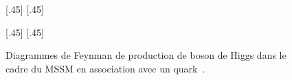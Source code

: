 \begin{figure}[h]
\centering
\vspace{\baselineskip}
\subcaptionbox{\label{subfig-fgraph-Higgs_with_b_qq_g_bbh-MSSM}}[.45\textwidth]
{\vspace{\baselineskip}}
\hfill
\subcaptionbox{\label{subfig-fgraph-gg_hHAbb}}[.45\textwidth]
{\vspace{\baselineskip}}

\vspace{2\baselineskip}
\subcaptionbox{\label{subfig-fgraph-bb_hHA}}[.45\textwidth]
{\vspace{\baselineskip}}
\hfill
\subcaptionbox{\label{subfig-fgraph-bg_b_bhHA}}[.45\textwidth]
{\vspace{\baselineskip}}

\caption[Production de boson de Higgs du MSSM en association avec un quark~\quarkb.]{Diagrammes de Feynman de production de boson de Higgs dans le cadre du MSSM en association avec un quark~\quarkb.}
\label{fig-fgraph-Higgs_prod_with_b-MSSM}
\end{figure}
